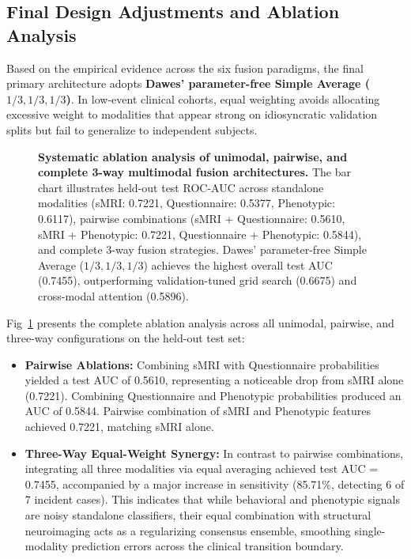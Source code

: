 \documentclass[10pt,letterpaper]{article}
\begin{document}
\subsection*{Final Design Adjustments and Ablation Analysis}

Based on the empirical evidence across the six fusion paradigms, the final primary architecture adopts \textbf{Dawes' parameter-free Simple Average ($1/3, 1/3, 1/3$)}. In low-event clinical cohorts, equal weighting avoids allocating excessive weight to modalities that appear strong on idiosyncratic validation splits but fail to generalize to independent subjects.

\begin{figure}[!h]
\caption{\textbf{Systematic ablation analysis of unimodal, pairwise, and complete 3-way multimodal fusion architectures.}
The bar chart illustrates held-out test ROC-AUC across standalone modalities (sMRI: 0.7221, Questionnaire: 0.5377, Phenotypic: 0.6117), pairwise combinations (sMRI + Questionnaire: 0.5610, sMRI + Phenotypic: 0.7221, Questionnaire + Phenotypic: 0.5844), and complete 3-way fusion strategies. Dawes' parameter-free Simple Average ($1/3, 1/3, 1/3$) achieves the highest overall test AUC (0.7455), outperforming validation-tuned grid search (0.6675) and cross-modal attention (0.5896).}
\label{fig:ablation_analysis}
\end{figure}

Fig~\ref{fig:ablation_analysis} presents the complete ablation analysis across all unimodal, pairwise, and three-way configurations on the held-out test set:
\begin{itemize}
    \item \textbf{Pairwise Ablations:} Combining sMRI with Questionnaire probabilities yielded a test AUC of 0.5610, representing a noticeable drop from sMRI alone (0.7221). Combining Questionnaire and Phenotypic probabilities produced an AUC of 0.5844. Pairwise combination of sMRI and Phenotypic features achieved 0.7221, matching sMRI alone.
    \item \textbf{Three-Way Equal-Weight Synergy:} In contrast to pairwise combinations, integrating all three modalities via equal averaging achieved test AUC = 0.7455, accompanied by a major increase in sensitivity (85.71\%, detecting 6 of 7 incident cases). This indicates that while behavioral and phenotypic signals are noisy standalone classifiers, their equal combination with structural neuroimaging acts as a regularizing consensus ensemble, smoothing single-modality prediction errors across the clinical transition boundary.
\end{itemize}
\end{document}
